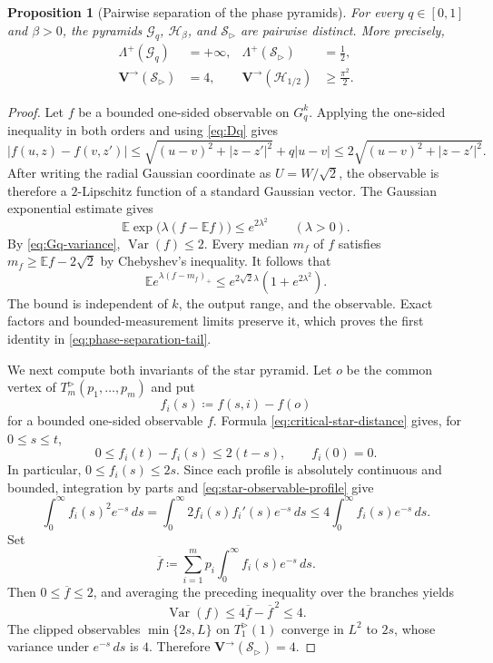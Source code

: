 \documentclass{amsart}
\numberwithin{equation}{section}
\theoremstyle{plain}
\newtheorem{proposition}[theorem]{Proposition}
\theoremstyle{definition}
\theoremstyle{remark}
\newcommand{\Var}{\operatorname{Var}}
\begin{document}
\begin{proposition}[Pairwise separation of the phase pyramids]
\label{prop:phase-pyramid-separation}
For every $q\in[0,1]$ and $\beta>0$, the pyramids
$\mathcal G_q$, $\mathcal H_\beta$, and $\mathcal S_{\rhd}$ are pairwise
distinct.  More precisely,
\begin{align}
 \Lambda^+(\mathcal G_q)&=+\infty,
 &\Lambda^+(\mathcal S_{\rhd})&=\frac12,
 \label{eq:phase-separation-tail}\\
 \mathbf{V}^{\to}(\mathcal S_{\rhd})&=4,
 &\mathbf{V}^{\to}(\mathcal H_{1/2})&\ge\frac{\pi^2}{2}.
 \label{eq:phase-separation-variance}
\end{align}
\end{proposition}

\begin{proof}
Let $f$ be a bounded one-sided observable on $G_q^k$.  Applying the
one-sided inequality in both orders and using \eqref{eq:Dq} gives
\[ |f(u,z)-f(v,z')| \le\sqrt{(u-v)^2+|z-z'|^2}+q|u-v| \le2\sqrt{(u-v)^2+|z-z'|^2}. \]
After writing the radial Gaussian coordinate as $U=W/\sqrt2$, the observable
is therefore a $2$-Lipschitz function of a standard Gaussian vector.  The
Gaussian exponential estimate gives
\begin{equation}\label{eq:Gq-centered-exponential} \mathbb E\exp\bigl(\lambda(f-\mathbb Ef)\bigr) \le e^{2\lambda^2} \qquad(\lambda>0). \end{equation}
By \eqref{eq:Gq-variance}, $\Var(f)\le2$.  Every median $m_f$ of $f$ satisfies
$m_f\ge\mathbb Ef-2\sqrt2$ by Chebyshev's inequality.  It follows that
\[ \mathbb E e^{\lambda(f-m_f)_+} \le e^{2\sqrt2\lambda} \left(1+e^{2\lambda^2}\right). \]
The bound is independent of $k$, the output range, and the observable.
Exact factors and bounded-measurement limits preserve it, which proves the
first identity in \eqref{eq:phase-separation-tail}.

We next compute both invariants of the star pyramid.  Let $o$ be the common
vertex of $T_m^{\rhd}(p_1,\ldots,p_m)$ and put
\[ f_i(s)\coloneqq f(s,i)-f(o) \]
for a bounded one-sided observable $f$.  Formula
\eqref{eq:critical-star-distance} gives, for $0\le s\le t$,
\begin{equation}\label{eq:star-observable-profile} 0\le f_i(t)-f_i(s)\le2(t-s), \qquad f_i(0)=0. \end{equation}
In particular, $0\le f_i(s)\le2s$.  Since each profile is absolutely
continuous and bounded, integration by parts and
\eqref{eq:star-observable-profile} give
\[ \int_0^\infty f_i(s)^2e^{-s}\,ds =\int_0^\infty2f_i(s)f_i'(s)e^{-s}\,ds \le4\int_0^\infty f_i(s)e^{-s}\,ds. \]
Set
\[ \overline f\coloneqq\sum_{i=1}^mp_i\int_0^\infty f_i(s)e^{-s}\,ds. \]
Then $0\le\overline f\le2$, and averaging the preceding inequality over
the branches yields
\[ \Var(f)\le4\overline f-\overline f^{\,2}\le4. \]
The clipped observables $\min\{2s,L\}$ on $T_1^{\rhd}(1)$ converge in
$L^2$ to $2s$, whose variance under $e^{-s}\,ds$ is $4$.  Therefore
$\mathbf{V}^{\to}(\mathcal S_{\rhd})=4$.


\end{proof}
\end{document}
